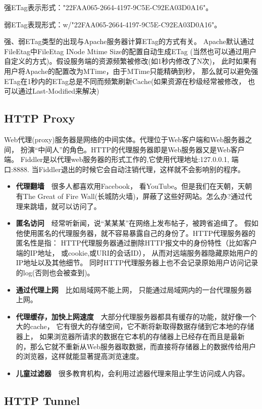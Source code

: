 \documentclass{book}
\begin{document}
强ETag表示形式："22FAA065-2664-4197-9C5E-C92EA03D0A16"。

弱ETag表现形式：w/"22FAA065-2664-4197-9C5E-C92EA03D0A16"。

强、弱ETag类型的出现与Apache服务器计算ETag的方式有关。
Apache默认通过FileEtag中FileEtag INode Mtime Size的配置自动生成ETag
(当然也可以通过用户自定义的方式)。假设服务端的资源频繁被修改(如1秒内修改了N次)，
此时如果有用户将Apache的配置改为MTime，由于MTime只能精确到秒，
那么就可以避免强ETag在1秒内的ETag总是不同而频繁刷新Cache(如果资源在秒级经常被修改，
也可以通过Last-Modified来解决)

\subsection{HTTP Proxy}

Web代理(proxy)服务器是网络的中间实体。代理位于Web客户端和Web服务器之间，
扮演“中间人”的角色。HTTP的代理服务器即是Web服务器又是Web客户端。
Fiddler是以代理web服务器的形式工作的,它使用代理地址:127.0.0.1, 端口:8888.
当Fiddler退出的时候它会自动注销代理，这样就不会影响别的程序。

\begin{itemize}
\item{\textbf{代理翻墙}}~~很多人都喜欢用Facebook， 看YouTube。但是我们在天朝，天朝有The Great of Fire Wall(长城防火墙)，屏蔽了这些好网站。怎么办?通过代理来跳墙，就可以访问了。
\item{\textbf{匿名访问}}~~经常听新闻，说“某某某”在网络上发布帖子，被跨省追缉了。
假如他使用匿名的代理服务器，就不容易暴露自己的身份了。HTTP代理服务器的匿名性是指： 
HTTP代理服务器通过删除HTTP报文中的身份特性（比如客户端的IP地址， 或cookie,或URI的会话ID），
从而对远端服务器隐藏原始用户的IP地址以及其他细节。 同时HTTP代理服务器上也不会记录原始用户访问记录的log(否则也会被查到)。
\item{\textbf{通过代理上网}}~~比如局域网不能上网， 只能通过局域网内的一台代理服务器上网。
\item{\textbf{代理缓存，加快上网速度}}~~大部分代理服务器都具有缓存的功能，就好像一个大的cache， 它有很大的存储空间，它不断将新取得数据存储到它本地的存储器上， 如果浏览器所请求的数据在它本机的存储器上已经存在而且是最新的，那么它就不重新从Web服务器取数据，而直接将存储器上的数据传给用户的浏览器，这样就能显著提高浏览速度。
\item{\textbf{儿童过滤器}}~~很多教育机构，会利用过滤器代理来阻止学生访问成人内容。
\end{itemize}

\subsection{HTTP Tunnel}
\end{document}
